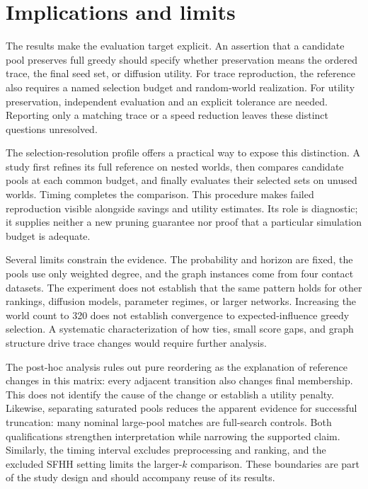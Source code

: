 \documentclass[smallextended]{svjour3}
\begin{document}
\FloatBarrier


\section{Implications and limits}

The results make the evaluation target explicit. An assertion that a candidate pool preserves full greedy should specify whether preservation means the ordered trace, the final seed set, or diffusion utility. For trace reproduction, the reference also requires a named selection budget and random-world realization. For utility preservation, independent evaluation and an explicit tolerance are needed. Reporting only a matching trace or a speed reduction leaves these distinct questions unresolved.

The selection-resolution profile offers a practical way to expose this distinction. A study first refines its full reference on nested worlds, then compares candidate pools at each common budget, and finally evaluates their selected sets on unused worlds. Timing completes the comparison. This procedure makes failed reproduction visible alongside savings and utility estimates. Its role is diagnostic; it supplies neither a new pruning guarantee nor proof that a particular simulation budget is adequate.

Several limits constrain the evidence. The probability and horizon are fixed, the pools use only weighted degree, and the graph instances come from four contact datasets. The experiment does not establish that the same pattern holds for other rankings, diffusion models, parameter regimes, or larger networks. Increasing the world count to 320 does not establish convergence to expected-influence greedy selection. A systematic characterization of how ties, small score gaps, and graph structure drive trace changes would require further analysis.

The post-hoc analysis rules out pure reordering as the explanation of reference changes in this matrix: every adjacent transition also changes final membership. This does not identify the cause of the change or establish a utility penalty. Likewise, separating saturated pools reduces the apparent evidence for successful truncation: many nominal large-pool matches are full-search controls. Both qualifications strengthen interpretation while narrowing the supported claim. Similarly, the timing interval excludes preprocessing and ranking, and the excluded SFHH setting limits the larger-\(k\) comparison. These boundaries are part of the study design and should accompany reuse of its results.
\end{document}
